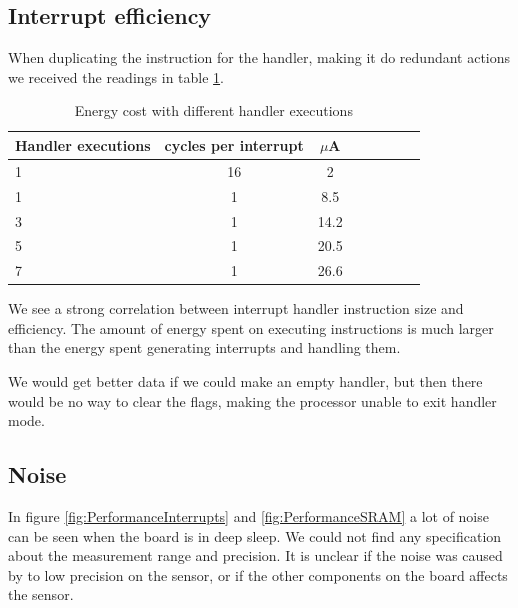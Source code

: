\subsection{Interrupt efficiency}
When duplicating the instruction for the handler, making it do redundant actions we received the readings in table \ref{tab:Handler}.

\begin{table}

\begin{center}
\begin{tabular}{l*{6}{c}r}
Handler executions & cycles per interrupt & $\mu$A \\
\hline
1 & 16 & 2  \\
1 & 1 & 8.5  \\
3 & 1 & 14.2  \\
5 & 1 & 20.5  \\
7 & 1 & 26.6  \\
\end{tabular}
\end{center}
\label{tab:Handler}
\caption{Energy cost with different handler executions}

\end{table}
We see a strong correlation between interrupt handler instruction size and efficiency. The amount of energy spent on executing instructions is much larger than the energy spent generating interrupts and handling them.

We would get better data if we could make an empty handler, but then there would be no way to clear the flags, making the processor unable to exit handler mode.

\subsection{Noise}
In figure \ref{fig:PerformanceInterrupts} and \ref{fig:PerformanceSRAM} a lot of noise can be seen when the board is in deep sleep. We could not find any specification about the measurement range and precision. It is unclear if the noise was caused by to low precision on the sensor, or if the other components on the board affects the sensor.

